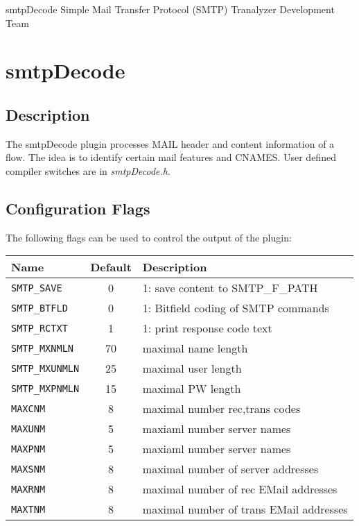 \documentclass[documentation]{subfiles}
\begin{document}
\trantitle
    {smtpDecode}
    {Simple Mail Transfer Protocol (SMTP)}
    {Tranalyzer Development Team}

\section{smtpDecode}\label{s:smtpDecode}

\subsection{Description}
The smtpDecode plugin processes MAIL header and content information of a flow. The idea is to identify
certain mail features and CNAMES. User defined compiler switches are in {\em smtpDecode.h}.

\subsection{Configuration Flags}
The following flags can be used to control the output of the plugin:
\begin{longtable}{lcl}
    \toprule
    {\bf Name} & {\bf Default} & {\bf Description} \\
    \midrule\endhead%
    {\tt SMTP\_SAVE} & 0 & 1: save content to SMTP\_F\_PATH \\
    {\tt SMTP\_BTFLD} & 0 & 1: Bitfield coding of SMTP commands \\
    {\tt SMTP\_RCTXT} & 1 & 1: print response code text \\
    {\tt SMTP\_MXNMLN} & 70 & maximal name length \\
    {\tt SMTP\_MXUNMLN} & 25 & maximal user length \\
    {\tt SMTP\_MXPNMLN} & 15 & maximal PW length \\
    {\tt MAXCNM} & 8 & maximal number rec,trans codes\\
    {\tt MAXUNM} & 5 & maxiaml number server names  \\
    {\tt MAXPNM} & 5 & maxiaml number server names  \\
    {\tt MAXSNM} & 8 & maximal number of server addresses\\
    {\tt MAXRNM} & 8 & maximal number of rec EMail addresses \\
    {\tt MAXTNM} & 8 & maximal number of trans EMail addresses\\
    \bottomrule
\end{longtable}
\end{document}
